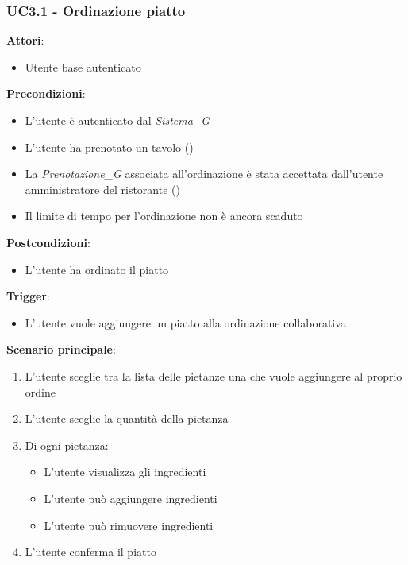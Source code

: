 \subsubsection{UC3.1 - Ordinazione piatto}\label{usecase:3_1}

\textbf{Attori}:
\begin{itemize}
    \item Utente base autenticato
\end{itemize}
\textbf{Precondizioni}:
\begin{itemize}
    \item L'utente è autenticato dal \textit{Sistema_G} 
    \item L'utente ha prenotato un tavolo ()
    \item La \textit{Prenotazione_G} associata all'ordinazione è stata accettata dall'utente amministratore del ristorante ()
    \item Il limite di tempo per l'ordinazione non è ancora scaduto
\end{itemize}
\textbf{Postcondizioni}:
\begin{itemize}
    \item L'utente ha ordinato il piatto
\end{itemize}
\textbf{Trigger}:
\begin{itemize}
    \item L'utente vuole aggiungere un piatto alla ordinazione collaborativa
\end{itemize}
\textbf{Scenario principale}:
\begin{enumerate}
    \item L'utente sceglie tra la lista delle pietanze una che vuole aggiungere al proprio ordine
    \item L'utente sceglie la quantità della pietanza
    \item Di ogni pietanza:
    \begin{itemize}
        \item L'utente visualizza gli ingredienti
        \item L'utente può aggiungere ingredienti
        \item L'utente può rimuovere ingredienti
    \end{itemize}
    \item L'utente conferma il piatto
\end{enumerate}
\newpage


